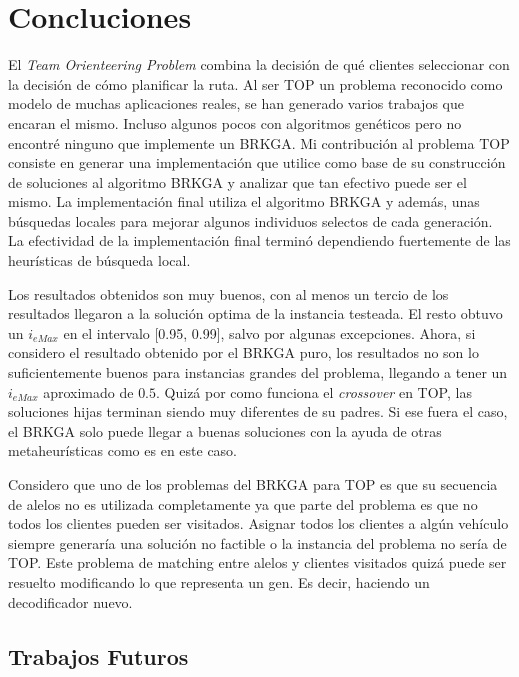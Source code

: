 \chapter{Concluciones}

\bigskip

El \textit{Team Orienteering Problem} combina la decisión de qué clientes seleccionar con la decisión de cómo planificar la ruta. Al ser TOP un problema reconocido como modelo de muchas aplicaciones reales, se han generado varios trabajos que encaran el mismo. Incluso algunos pocos con algoritmos genéticos pero no encontré ninguno que implemente un BRKGA. Mi contribución al problema TOP consiste en generar una implementación que utilice como base de su construcción de soluciones al algoritmo BRKGA y analizar que tan efectivo puede ser el mismo. La implementación final utiliza el algoritmo BRKGA y además, unas búsquedas locales para mejorar algunos individuos selectos de cada generación. La efectividad de la implementación final terminó dependiendo fuertemente de las heurísticas de búsqueda local.

\bigskip

Los resultados obtenidos son muy buenos, con al menos un tercio de los resultados llegaron a la solución optima de la instancia testeada. El resto obtuvo un $i_{eMax}$ en el intervalo [0.95, 0.99], salvo por algunas excepciones. Ahora, si considero el resultado obtenido por el BRKGA puro, los resultados no son lo suficientemente buenos para instancias grandes del problema, llegando a tener un $i_{eMax}$ aproximado de $0.5$. Quizá por como funciona el \textit{crossover} en TOP, las soluciones hijas terminan siendo muy diferentes de su padres. Si ese fuera el caso, el BRKGA solo puede llegar a buenas soluciones con la ayuda de otras metaheurísticas como es en este caso.

\bigskip

Considero que uno de los problemas del BRKGA para TOP es que su secuencia de alelos no es utilizada completamente ya que parte del problema es que no todos los clientes pueden ser visitados. Asignar todos los clientes a algún vehículo siempre generaría una solución no factible o la instancia del problema no sería de TOP. Este problema de matching entre alelos y clientes visitados quizá puede ser resuelto modificando lo que representa un gen. Es decir, haciendo un decodificador nuevo.

\section{Trabajos Futuros}

